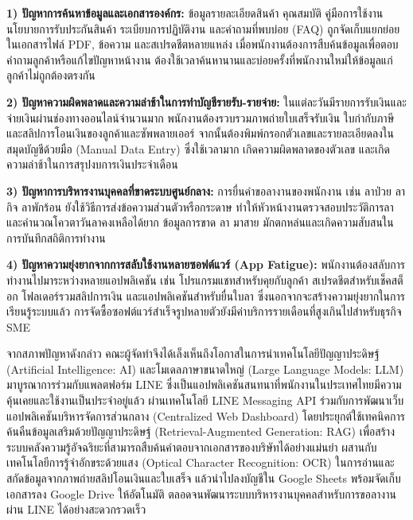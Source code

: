 \vspace{0.2em}
\noindent\hspace*{1.3em}\textbf{1) ปัญหาการค้นหาข้อมูลและเอกสารองค์กร:} ข้อมูลรายละเอียดสินค้า คุณสมบัติ คู่มือการใช้งาน นโยบายการรับประกันสินค้า ระเบียบการปฏิบัติงาน และคำถามที่พบบ่อย (FAQ) ถูกจัดเก็บแยกย่อยในเอกสารไฟล์ PDF, ข้อความ และสเปรดชีตหลายแหล่ง เมื่อพนักงานต้องการสืบค้นข้อมูลเพื่อตอบคำถามลูกค้าหรือแก้ไขปัญหาหน้างาน ต้องใช้เวลาค้นหานานและบ่อยครั้งที่พนักงานใหม่ให้ข้อมูลแก่ลูกค้าไม่ถูกต้องตรงกัน\par\vspace{0.3em}

\noindent\hspace*{1.3em}\textbf{2) ปัญหาความผิดพลาดและความล่าช้าในการทำบัญชีรายรับ-รายจ่าย:} ในแต่ละวันมีรายการรับเงินและจ่ายเงินผ่านช่องทางออนไลน์จำนวนมาก พนักงานต้องรวบรวมภาพถ่ายใบเสร็จรับเงิน ใบกำกับภาษี และสลิปการโอนเงินของลูกค้าและซัพพลายเออร์ จากนั้นต้องพิมพ์กรอกตัวเลขและรายละเอียดลงในสมุดบัญชีด้วยมือ (Manual Data Entry) ซึ่งใช้เวลามาก เกิดความผิดพลาดของตัวเลข และเกิดความล่าช้าในการสรุปงบการเงินประจำเดือน\par\vspace{0.3em}

\noindent\hspace*{1.3em}\textbf{3) ปัญหาการบริหารงานบุคคลที่ขาดระบบศูนย์กลาง:} การยื่นคำขอลางานของพนักงาน เช่น ลาป่วย ลากิจ ลาพักร้อน ยังใช้วิธีการส่งข้อความส่วนตัวหรือกระดาษ ทำให้หัวหน้างานตรวจสอบประวัติการลาและคำนวณโควตาวันลาคงเหลือได้ยาก ข้อมูลการขาด ลา มาสาย มักตกหล่นและเกิดความสับสนในการบันทึกสถิติการทำงาน\par\vspace{0.3em}

\noindent\hspace*{1.3em}\textbf{4) ปัญหาความยุ่งยากจากการสลับใช้งานหลายซอฟต์แวร์ (App Fatigue):} พนักงานต้องสลับการทำงานไปมาระหว่างหลายแอปพลิเคชัน เช่น โปรแกรมแชทสำหรับคุยกับลูกค้า สเปรดชีตสำหรับเช็คสต็อก โฟลเดอร์รวมสลิปการเงิน และแอปพลิเคชันสำหรับยื่นใบลา ซึ่งนอกจากจะสร้างความยุ่งยากในการเรียนรู้ระบบแล้ว การจัดซื้อซอฟต์แวร์สำเร็จรูปหลายตัวยังมีค่าบริการรายเดือนที่สูงเกินไปสำหรับธุรกิจ SME\par\vspace{0.4em}

\hspace*{1.3em}
จากสภาพปัญหาดังกล่าว คณะผู้จัดทำจึงได้เล็งเห็นถึงโอกาสในการนำเทคโนโลยีปัญญาประดิษฐ์ (Artificial Intelligence: AI) และโมเดลภาษาขนาดใหญ่ (Large Language Models: LLM) มาบูรณาการร่วมกับแพลตฟอร์ม LINE ซึ่งเป็นแอปพลิเคชันสนทนาที่พนักงานในประเทศไทยมีความคุ้นเคยและใช้งานเป็นประจำอยู่แล้ว ผ่านเทคโนโลยี LINE Messaging API ร่วมกับการพัฒนาเว็บแอปพลิเคชันบริหารจัดการส่วนกลาง (Centralized Web Dashboard) โดยประยุกต์ใช้เทคนิคการค้นคืนข้อมูลเสริมด้วยปัญญาประดิษฐ์ (Retrieval-Augmented Generation: RAG) เพื่อสร้างระบบคลังความรู้อัจฉริยะที่สามารถสืบค้นคำตอบจากเอกสารของบริษัทได้อย่างแม่นยำ ผสานกับเทคโนโลยีการรู้จำอักขระด้วยแสง (Optical Character Recognition: OCR) ในการอ่านและสกัดข้อมูลจากภาพถ่ายสลิปโอนเงินและใบเสร็จ แล้วนำไปลงบัญชีใน Google Sheets พร้อมจัดเก็บเอกสารลง Google Drive ให้อัตโนมัติ ตลอดจนพัฒนาระบบบริหารงานบุคคลสำหรับการขอลางานผ่าน LINE ได้อย่างสะดวกรวดเร็ว

